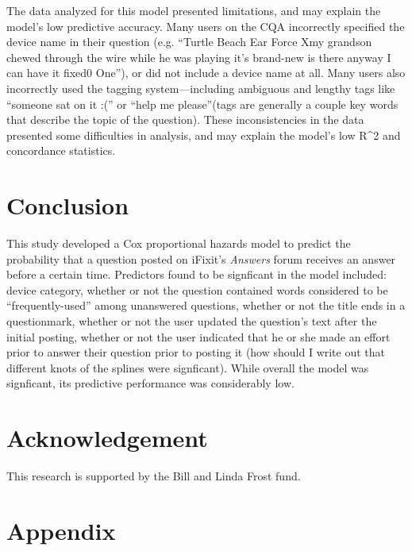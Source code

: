 \documentclass{article}
\begin{document}
The data analyzed for this model presented limitations, and may explain the model's low predictive accuracy. Many users on the CQA incorrectly specified the device name in their question (e.g. ``Turtle Beach Ear Force Xmy grandson chewed through the wire while he was playing it's brand-new is there anyway I can have it fixed0 One''), or did not include a device name at all. Many users also incorrectly used the tagging system---including ambiguous and lengthy tags like ``someone sat on it :('' or ``help me please\!\!\!\!\!''(tags are generally a couple key words that describe the topic of the question). These inconsistencies in the data presented some difficulties in analysis, and may explain the model's low R^2 and concordance statistics. 


\section*{Conclusion}

This study developed a Cox proportional hazards model to predict the probability that a question posted on iFixit's \textit{Answers} forum receives an answer before a certain time. Predictors found to be signficant in the model included: device category, whether or not the question contained words considered to be ``frequently-used'' among unanswered questions, whether or not the title ends in a questionmark, whether or not the user updated the question's text after the initial posting, whether or not the user indicated that he or she made an effort prior to answer their question prior to posting it (how should I write out that different knots of the splines were signficant). While overall the model was signficant, its predictive performance was considerably low. 


\section*{Acknowledgement}

This research is supported by the Bill and Linda Frost fund. 


\section*{Appendix} 
\end{document}
